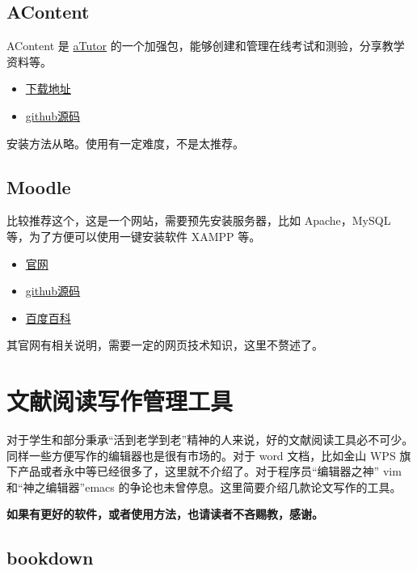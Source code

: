 \documentclass[doctor,openright,twoside]{sjtuthesis}
\providecommand{\tightlist}{%
    \setlength{\itemsep}{0pt}\setlength{\parskip}{0pt}}
\theoremstyle{plain}
\theoremstyle{definition}
\theoremstyle{remark}
\theoremstyle{ocrenumbox}
\theoremstyle{plain}
\begin{document}
\hypertarget{acontent}{%
\subsection{AContent}\label{acontent}}

AContent 是 \href{https://github.com/atutor?tab=repositories}{aTutor}
的一个加强包，能够创建和管理在线考试和测验，分享教学资料等。

\begin{itemize}
\tightlist
\item
  \href{https://atutor.github.io/acontent/downloads.html}{下载地址}
\item
  \href{https://github.com/atutor/AContent}{github源码}
\end{itemize}

安装方法从略。使用有一定难度，不是太推荐。

\hypertarget{moodle}{%
\subsection{Moodle}\label{moodle}}

比较推荐这个，这是一个网站，需要预先安装服务器，比如 Apache，MySQL
等，为了方便可以使用一键安装软件 XAMPP 等。

\begin{itemize}
\tightlist
\item
  \href{https://moodle.org/}{官网}
\item
  \href{https://github.com/moodle/moodle}{github源码}
\item
  \href{https://baike.baidu.com/item/moodle}{百度百科}
\end{itemize}

其官网有相关说明，需要一定的网页技术知识，这里不赘述了。

\section{文献阅读写作管理工具}

对于学生和部分秉承``活到老学到老''精神的人来说，好的文献阅读工具必不可少。同样一些方便写作的编辑器也是很有市场的。对于
word 文档，比如金山 WPS
旗下产品或者永中等已经很多了，这里就不介绍了。对于程序员``编辑器之神''
vim 和``神之编辑器''emacs
的争论也未曾停息。这里简要介绍几款论文写作的工具。

\textbf{如果有更好的软件，或者使用方法，也请读者不吝赐教，感谢。}

\hypertarget{bookdown}{%
\subsection{bookdown}\label{bookdown}}
\end{document}
